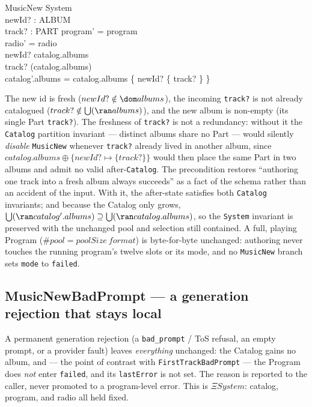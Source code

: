 \documentclass[a4paper,10pt,fleqn]{article}
\begin{document}
\begin{schema}{MusicNew}
  \Delta System \\
  newId? : ALBUM \\
  track? : PART
  \where
  program' = program \\
  radio' = radio \\
  newId? \notin \dom catalog.albums \\
  track? \notin \bigcup (\ran catalog.albums) \\
  catalog'.albums = catalog.albums \oplus \{ newId? \mapsto \{ track? \} \}
\end{schema}

The new id is fresh ($newId? \notin \dom albums$), the incoming \texttt{track?}
is not already catalogued ($track? \notin \bigcup (\ran albums)$), and the new
album is non-empty (its single Part \texttt{track?}). The freshness of
\texttt{track?} is not a redundancy: without it the \texttt{Catalog} partition
invariant --- distinct albums share no Part --- would silently \emph{disable}
\texttt{MusicNew} whenever \texttt{track?} already lived in another album, since
$catalog.albums \oplus \{newId? \mapsto \{track?\}\}$ would then place the same
Part in two albums and admit no valid after-\texttt{Catalog}. The precondition
restores ``authoring one track into a fresh album always succeeds'' as a fact of
the schema rather than an accident of the input. With it, the after-state
satisfies both \texttt{Catalog} invariants; and because the Catalog only grows,
$\bigcup (\ran catalog'.albums) \supseteq \bigcup (\ran catalog.albums)$, so the
\texttt{System} invariant is preserved with the unchanged pool and selection
still contained. A full, playing Program ($\# pool = poolSize~format$) is
byte-for-byte unchanged: authoring never touches the running program's twelve
slots or its mode, and no \texttt{MusicNew} branch sets \texttt{mode} to
\texttt{failed}.

\subsection{MusicNewBadPrompt --- a generation rejection that stays local}

A permanent generation rejection (a \texttt{bad\_prompt} / ToS refusal, an empty
prompt, or a provider fault) leaves \emph{everything} unchanged: the Catalog
gains no album, and --- the point of contrast with \texttt{FirstTrackBadPrompt}
--- the Program does \emph{not} enter \texttt{failed}, and its \texttt{lastError}
is not set. The reason is reported to the caller, never promoted to a
program-level error. This is \texttt{$\Xi System$}: catalog, program, and radio
all held fixed.
\end{document}
